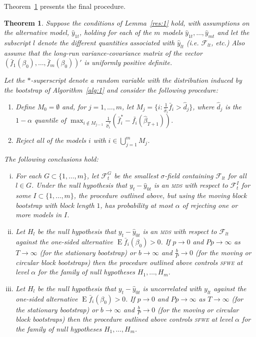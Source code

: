 \documentclass[11pt,fleqn]{article}
\newtheorem{thm}{Theorem}
\theoremstyle{definition}
\DeclareMathOperator{\E}{E}
\newcommand{\mds}{\textsc{mds}}
\newcommand{\sfwe}{\textsc{sfwe}}
\begin{document}
Theorem~\ref{res:2} presents the final procedure.

\begin{thm}\label{res:2}
  Suppose the conditions of Lemma~\ref{res:1} hold, with assumptions
  on the alternative model, $\hat{y}_{1t}$, holding for each of the
  $m$ models $\hat{y}_{1t}, \dots, \hat{y}_{mt}$ and let the subscript
  $l$ denote the different quantities associated with $\hat{y}_{lt}$
  (i.e. $\mathcal{F}_{lt}$, etc.)  Also assume that the long-run
  variance-covariance matrix of the vector
  $(\bar{f}_1(\beta_0),\dots,\bar{f}_m(\beta_0))'$ is uniformly
  positive definite.

  Let the $*$-superscript denote a random variable with the
  distribution induced by the bootstrap of Algorithm~\ref{alg:1} and
  consider the following procedure:
  \begin{enumerate}
  \item Define $M_0 = \emptyset$ and, for $j = 1,\dots,m$, let $M_j =
    \{i : \tfrac1{\hat\sigma_i} \bar{f}_{i} > \hat{d}_j\}$, where
    $\hat{d}_j$ is the $1-\alpha$ quantile of $\max_{i \notin M_{j-1}}
    \tfrac{1}{\hat{\sigma}_i^{*}}(\bar{f}_{i}^{*} -
    \bar{f_i}(\hat{\beta}_{T+1}))$.
  \item Reject all of the models $i$ with $i \in \bigcup_{j=1}^m M_j$.
  \end{enumerate}
  The following conclusions hold:
  \begin{enumerate}[i.]
  \item\label{it:1} For each $G \subset \{1,\dots,m\}$, let
    $\mathcal{F}_t^G$ be the smallest $\sigma$-field containing
    $\mathcal{F}_{lt}$ for all $l \in G$.  Under the null hypothesis
    that $y_t - \hat{y}_{0t}$ is an \textsl{\mds} with respect to
    $\mathcal{F}_t^I$ for some $I \subset \{1,\dots,m\}$, the
    procedure outlined above, but using the moving block bootstrap
    with block length $1$, has probability at most $\alpha$ of
    rejecting one or more models in $I$.
  \item\label{it:2} Let $H_l$ be the null hypothesis that $y_t -
    \hat{y}_{0t}$ is an \textsl{\mds} with respect to
    $\mathcal{F}_{lt}$ against the one-sided alternative $\E \bar
    f_i(\beta_0) > 0$.  If $p \to 0$ and $P p \to \infty$ as $T \to
    \infty$ (for the stationary bootstrap) or $b \to \infty$ and
    $\frac{b}{P} \to 0$ (for the moving or circular block bootstraps)
    then the procedure outlined above controls \textsl{\sfwe} at level
    $\alpha$ for the family of null hypotheses $H_1,\dots,H_m$.
  \item\label{it:3} Let $H_l$ be the null hypothesis that $y_t -
    \hat{y}_{0t}$ is uncorrelated with $\hat{y}_{lt}$ against the
    one-sided alternative $\E \bar f_i(\beta_0) > 0$.  If $p \to 0$
    and $P p \to \infty$ as $T \to \infty$ (for the stationary
    bootstrap) or $b \to \infty$ and $\frac{b}{P} \to 0$ (for the
    moving or circular block bootstraps) then the procedure outlined
    above controls \textsl{\sfwe} at level $\alpha$ for the family of
    null hypotheses $H_1,\dots,H_m$.
  \end{enumerate}
\end{thm}
\end{document}
